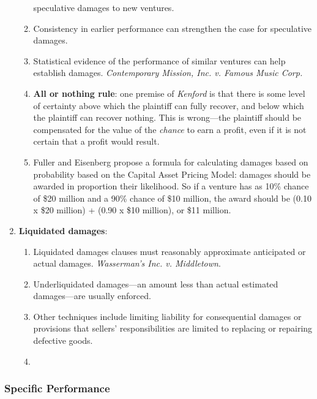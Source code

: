 \begin{enumerate}
\begin{enumerate}
        speculative damages to new ventures.
        \item Consistency in earlier performance can strengthen the case for 
        speculative damages.
        \item Statistical evidence of the performance of similar ventures can 
        help establish damages. \emph{Contemporary Mission, Inc. v. Famous 
        Music Corp.}
        \item \textbf{All or nothing rule}: one premise of \emph{Kenford} is 
        that there is some level of certainty above which the plaintiff can 
        fully recover, and below which the plaintiff can recover nothing. This 
        is wrong---the plaintiff should be compensated for the value of the 
        \emph{chance} to earn a profit, even if it is not certain that a 
        profit would result.
        \item Fuller and Eisenberg propose a formula for calculating damages 
        based on probability based on the Capital Asset Pricing Model: damages 
        should be awarded in proportion their likelihood.  So if a venture has 
        as 10\% chance of \$20 million and a 90\% chance of \$10 million, the 
        award should be (0.10 x \$20 million) + (0.90 x \$10 million), or \$11 
        million.
    \end{enumerate}
    \item \textbf{Liquidated damages}:
    \begin{enumerate}
        \item Liquidated damages clauses must reasonably approximate 
        anticipated or actual damages. \emph{Wasserman's Inc. v. Middletown}.
        \item Underliquidated damages---an amount less than actual estimated 
        damages---are usually enforced.
        \item Other techniques include limiting liability for consequential 
        damages or provisions that sellers' responsibilities are limited to 
        replacing or repairing defective goods.
        \item 
    \end{enumerate}
\end{enumerate}

\subsubsection{Specific Performance}

